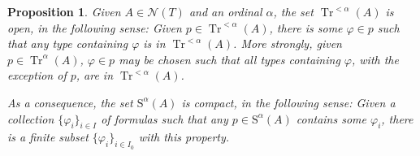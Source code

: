 \documentclass{article}
\newtheorem{prop}[theorem]{Proposition}
\theoremstyle{nonumberplain}
\newcommand{\calN}{\mathcal{N}}
\newcommand{\Stone}{\mathrm{S}}
\DeclareMathOperator{\Tr}{Tr}
\begin{document}
\begin{prop}\label{prop:open}
Given $A \in \calN(T)$ and an ordinal $\alpha$, the set $\Tr^{<\alpha}(A)$ is open, in the following sense: Given $p \in \Tr^{<\alpha}(A)$, there is some $\varphi \in p$ such that any type containing $\varphi$ is in $\Tr^{<\alpha}(A)$. More strongly, given $p \in \Tr^\alpha(A)$, $\varphi \in p$ may be chosen such that all types containing $\varphi$, with the exception of $p$, are in $\Tr^{<\alpha}(A)$.

As a consequence, the set $\Stone^\alpha(A)$ is compact, in the following sense: Given a collection $\{\varphi_i\}_{i \in I}$ of formulas such that any $p \in \Stone^\alpha(A)$ contains some $\varphi_i$, there is a finite subset $\{\varphi_i\}_{i \in I_0}$ with this property.
\end{prop}
\end{document}
